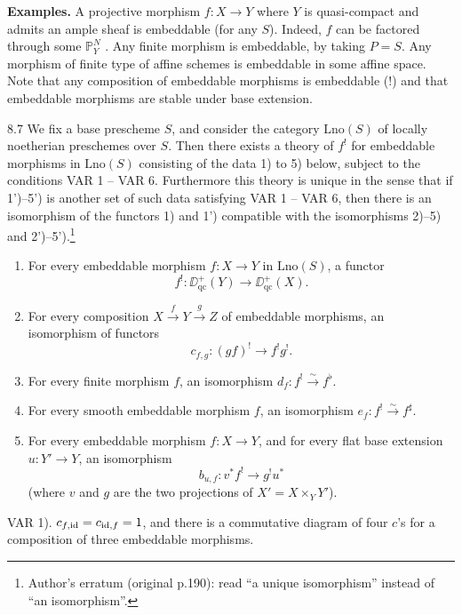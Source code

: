 \textbf{Examples.}
A projective morphism $f\colon X\to Y$ where $Y$ is quasi-compact and admits an ample sheaf is embeddable (for any $S$). Indeed, $f$ can be factored through some $\mathbb{P}_Y^N$ \cite[\nopp II,~5.5.4(ii)]{EGA}. Any finite morphism is embeddable, by taking $P=S$. Any morphism of finite type of affine schemes is embeddable in some affine space. Note that any composition of embeddable morphisms is embeddable (!) and that embeddable morphisms are stable under base extension.

\begin{booktheorem}{8.7}\label{thm:3.8.7}
We fix a base prescheme $S$, and consider the category $\mathrm{Lno}(S)$ of locally noetherian preschemes over $S$. Then there exists a theory of $f^!$ for embeddable morphisms in $\mathrm{Lno}(S)$ consisting of the data 1) to 5) below, subject to the conditions VAR 1 -- VAR 6. Furthermore this theory is unique in the sense that if 1')--5') is another set of such data satisfying VAR 1 -- VAR 6, then there is an isomorphism of the functors 1) and 1') compatible with the isomorphisms 2)--5) and 2')--5').\footnote{Author's erratum (original p.190): read ``a unique isomorphism'' instead of ``an isomorphism''.}

\begin{enumerate}\renewcommand{\labelenumi}{\arabic{enumi})}
\item For every embeddable morphism $f\colon X\to Y$ in $\mathrm{Lno}(S)$, a functor
\[
f^!\colon \DD_{\mathrm{qc}}^+(Y) \longrightarrow \DD_{\mathrm{qc}}^+(X).
\]
\item For every composition $X\xrightarrow{f} Y\xrightarrow{g} Z$ of embeddable morphisms, an isomorphism of functors
\[
c_{f,g}\colon (gf)^! \longrightarrow f^!g^!.
\]
\item For every finite morphism $f$, an isomorphism $d_f\colon f^!\xrightarrow{\sim} f^{\flat}$.
\item For every smooth embeddable morphism $f$, an isomorphism $e_f\colon f^!\xrightarrow{\sim} f^{\sharp}$.
\item For every embeddable morphism $f\colon X\to Y$, and for every flat base extension $u\colon Y'\to Y$, an isomorphism
\[
b_{u,f}\colon v^*f^! \longrightarrow g^!u^*
\]
(where $v$ and $g$ are the two projections of $X'=X\times_Y Y'$).
\end{enumerate}

VAR 1). $c_{f,\operatorname{id}}=c_{\operatorname{id},f}=1$, and there is a commutative diagram of four $c$'s for a composition of three embeddable morphisms.


\end{booktheorem}
